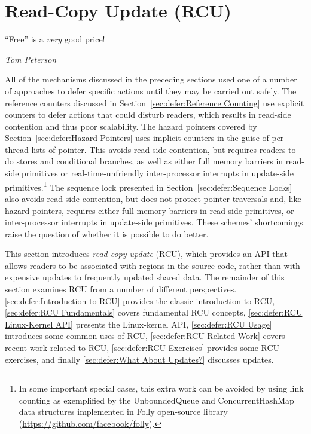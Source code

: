 
\section{Read-Copy Update (RCU)}
\label{sec:defer:Read-Copy Update (RCU)}
%
\epigraph{``Free'' is a \emph{very} good price!}{\emph{Tom Peterson}}

All of the mechanisms discussed in the preceding sections
used one of a number of approaches to defer specific actions
until they may be carried out safely.
The reference counters discussed in
Section~\ref{sec:defer:Reference Counting}
use explicit counters to defer actions that could disturb readers,
which results in read-side contention and thus poor scalability.
The hazard pointers covered by
Section~\ref{sec:defer:Hazard Pointers}
uses implicit counters in the guise of per-thread lists of pointer.
This avoids read-side contention, but requires readers to do stores and
conditional branches, as well as either full memory barriers in read-side
primitives or real-time-unfriendly inter-processor interrupts in
update-side primitives.\footnote{
	In some important special cases, this extra work can be avoided
	by using link counting as exemplified by the UnboundedQueue
	and ConcurrentHashMap data structures implemented in Folly
	open-source library
	(\url{https://github.com/facebook/folly}).}
The sequence lock presented in
Section~\ref{sec:defer:Sequence Locks}
also avoids read-side contention, but does not protect pointer
traversals and, like hazard pointers, requires either full memory barriers
in read-side primitives, or inter-processor interrupts in update-side
primitives.
These schemes' shortcomings raise the question of
whether it is possible to do better.

This section introduces \emph{read-copy update} (RCU), which provides
an API that allows readers to be associated with regions in the source code,
rather than with expensive updates to frequently updated shared data.
The remainder of this
section examines RCU from a number of different perspectives.
\cref{sec:defer:Introduction to RCU} provides the classic
introduction to RCU,
\cref{sec:defer:RCU Fundamentals} covers fundamental RCU
concepts,
\cref{sec:defer:RCU Linux-Kernel API} presents the Linux-kernel
API,
\cref{sec:defer:RCU Usage} introduces some common uses of RCU,
\cref{sec:defer:RCU Related Work} covers recent work related
to RCU,
\cref{sec:defer:RCU Exercises} provides some RCU exercises,
and finally
\cref{sec:defer:What About Updates?}
discusses updates.






